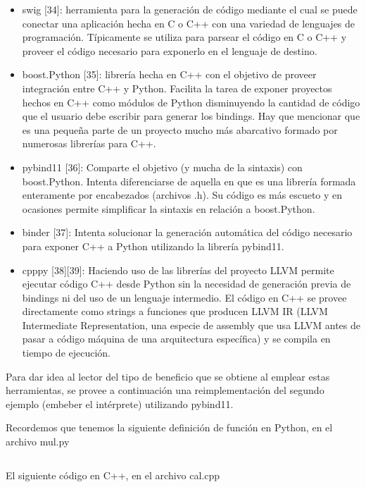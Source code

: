 \documentclass[]{article}
\begin{document}
\begin{itemize}
    \item swig [34]: herramienta para la generación de código mediante el cual
se puede conectar una aplicación hecha en C o C++ con una variedad de lenguajes
de programación. Típicamente se utiliza para parsear el código en C o C++ y
proveer el código necesario para exponerlo en el lenguaje de destino.

    \item boost.Python [35]: librería hecha en C++ con el objetivo de proveer
integración entre C++ y Python. Facilita la tarea de exponer proyectos hechos
en C++ como módulos de Python disminuyendo la cantidad de código que el usuario
debe escribir para generar los bindings. Hay que mencionar que es una pequeña
parte de un proyecto mucho más abarcativo formado por numerosas librerías para
C++.

    \item pybind11 [36]: Comparte el objetivo (y mucha de la sintaxis) con
boost.Python.  Intenta diferenciarse de aquella en que es una librería formada
enteramente por encabezados (archivos .h). Su código es más escueto y en
ocasiones permite simplificar la sintaxis en relación a boost.Python. 

    \item binder [37]: Intenta solucionar la generación automática del código
necesario para exponer C++ a Python utilizando la librería pybind11.

    \item cpppy [38][39]: Haciendo uso de las librerías del proyecto LLVM
permite ejecutar código C++ desde Python sin la necesidad de generación previa
de bindings ni del uso de un lenguaje intermedio. El código en C++ se provee
directamente como strings a funciones que producen LLVM IR (LLVM Intermediate
Representation, una especie de assembly que usa LLVM antes de pasar a código
máquina de una arquitectura específica) y se compila en tiempo de ejecución.
\end{itemize}

Para dar idea al lector del tipo de beneficio que se obtiene al emplear estas
herramientas, se provee a continuación una reimplementación del segundo ejemplo
(embeber el intérprete) utilizando pybind11.

Recordemos que tenemos la siguiente definición de función en Python, en el
archivo mul.py

\inputminted{Python}{codelistings/multiply.py}

El siguiente código en C++, en el archivo cal.cpp
\end{document}
